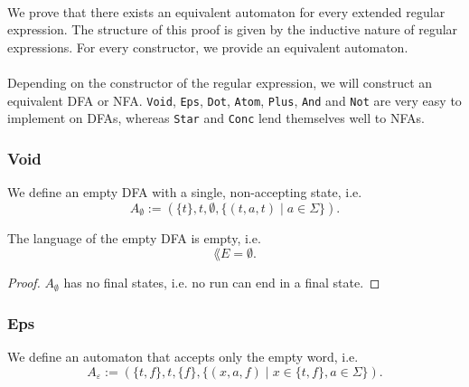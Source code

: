 \paragraph{} 
We prove that there exists an equivalent automaton for every extended regular expression.
The structure of this proof is given by the inductive nature of regular expressions.
For every constructor, we provide an equivalent automaton.

\paragraph{}
Depending on the constructor of the regular expression, we will construct an equivalent DFA or NFA.
\lstinline{Void}, \lstinline{Eps}, \lstinline{Dot}, \lstinline{Atom}, \lstinline{Plus}, \lstinline{And} and \lstinline{Not} are very easy to implement on DFAs, whereas \lstinline{Star} and \lstinline{Conc} lend themselves well to NFAs.

\subsubsection{Void}
\begin{definition}
    We define an empty DFA with a single, non-accepting state, i.e.
    \begin{equation*}
        A_\emptyset := (\{t\}, t, \emptyset, \{(t, a, t) \; | \; a \in \Sigma\}).
    \end{equation*}
\end{definition}

\begin{lemma}
    \label{dfa_empty_correct}
    The language of the empty DFA is empty, i.e.
    \begin{equation*}
        \lang{E} = \emptyset.
    \end{equation*}
\end{lemma}

\begin{proof}
    $A_\emptyset$ has no final states, i.e. no run can end in a final state.
\end{proof}




\subsubsection{Eps}
\begin{definition}
    We define an automaton that accepts only the empty word, i.e.
    \begin{equation*}
        A_\varepsilon := (\{t, f\}, t, \{f\}, \{(x, a, f) \; | \; x \in \{t, f\}, a \in \Sigma\}).
    \end{equation*}
\end{definition}

